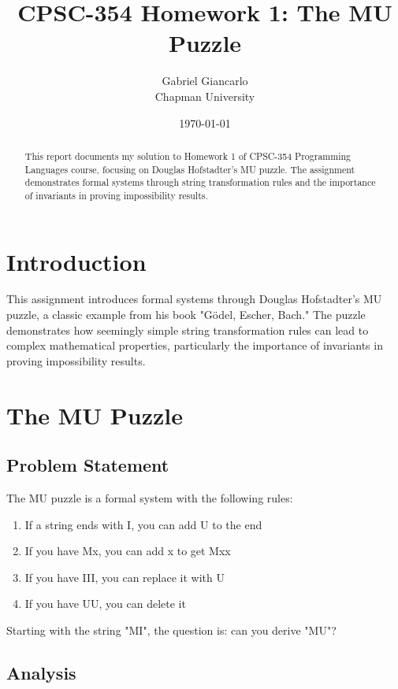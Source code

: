 \documentclass{article}
\title{CPSC-354 Homework 1: The MU Puzzle}
\author{Gabriel Giancarlo \\ Chapman University}
\date{\today}
\theoremstyle{plain}
\theoremstyle{definition}
\theoremstyle{remark}
\begin{document}
\maketitle

\begin{abstract}
This report documents my solution to Homework 1 of CPSC-354 Programming Languages course, focusing on Douglas Hofstadter's MU puzzle. The assignment demonstrates formal systems through string transformation rules and the importance of invariants in proving impossibility results.
\end{abstract}

\setcounter{tocdepth}{3}
\tableofcontents

\section{Introduction}\label{intro}

This assignment introduces formal systems through Douglas Hofstadter's MU puzzle, a classic example from his book "Gödel, Escher, Bach." The puzzle demonstrates how seemingly simple string transformation rules can lead to complex mathematical properties, particularly the importance of invariants in proving impossibility results.

\section{The MU Puzzle}\label{mu_puzzle}

\subsection{Problem Statement}

The MU puzzle is a formal system with the following rules:
\begin{enumerate}
\item If a string ends with I, you can add U to the end
\item If you have Mx, you can add x to get Mxx
\item If you have III, you can replace it with U
\item If you have UU, you can delete it
\end{enumerate}

Starting with the string "MI", the question is: can you derive "MU"?

\subsection{Analysis}
\end{document}
